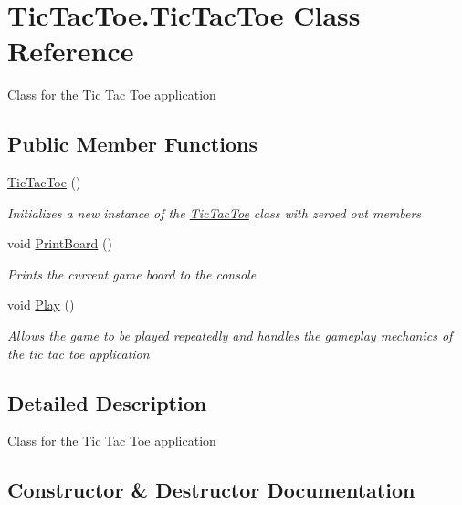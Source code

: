 \hypertarget{class_tic_tac_toe_1_1_tic_tac_toe}{}\section{Tic\+Tac\+Toe.\+Tic\+Tac\+Toe Class Reference}
\label{class_tic_tac_toe_1_1_tic_tac_toe}


Class for the Tic Tac Toe application  


\subsection*{Public Member Functions}
\begin{DoxyCompactItemize}
\item 
\hyperlink{class_tic_tac_toe_1_1_tic_tac_toe_a3824d4169db029fc539683661dc558ee}{Tic\+Tac\+Toe} ()
\begin{DoxyCompactList}\small\item\em Initializes a new instance of the \hyperlink{class_tic_tac_toe_1_1_tic_tac_toe}{Tic\+Tac\+Toe} class with zeroed out members \end{DoxyCompactList}\item 
void \hyperlink{class_tic_tac_toe_1_1_tic_tac_toe_a96810a66e906f7d1c01928582707fd44}{Print\+Board} ()
\begin{DoxyCompactList}\small\item\em Prints the current game board to the console \end{DoxyCompactList}\item 
void \hyperlink{class_tic_tac_toe_1_1_tic_tac_toe_a5e506ff8851b71a18ccc16c04a9a6e4e}{Play} ()
\begin{DoxyCompactList}\small\item\em Allows the game to be played repeatedly and handles the gameplay mechanics of the tic tac toe application \end{DoxyCompactList}\end{DoxyCompactItemize}


\subsection{Detailed Description}
Class for the Tic Tac Toe application 



\subsection{Constructor \& Destructor Documentation}
\hypertarget{class_tic_tac_toe_1_1_tic_tac_toe_a3824d4169db029fc539683661dc558ee}{}
